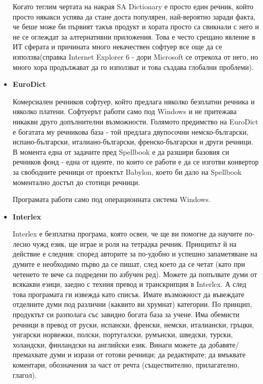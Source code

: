 \begin{itemize}
    Когато теглим чертата на накрая SA Dictionary е просто един
    речник, който просто някакси успява да стане доста популярен,
    най-вероятно заради факта, че беше може би първият такъв продукт и
    хората просто са свикнали с него и не се оглеждат за алтернативни
    приложения. Това е често срещано явление в ИТ сферата и причината
    много некачествен софтуер все още да се използва(справка Internet
    Explorer 6 - дори Microsoft се отрекоха от него, но много хора
    продължават да го използват и това създава глобални проблеми).

  \item \textbf{EuroDict}

    Комерсиален речников софтуер, който предлага няколко безплатни
    речника и няколко платени. Софтуерът работи само под Windows и не
    притежава никакви друго допълнителни възможности. Голямото
    предимство на EuroDict е богатата му речникова база - той предлага
    двупосочни немско-български, испано-български, италиано-български,
    френско-български и други речници. В момента една от задачите пред
    Spellbook е да разшири базовия си речников фонд - една от идеите,
    по които се работи е да се изготви конвертор за свободните речници
    от проектът Babylon, което би дало на Spellbook моментално достъп
    до стотици речници.

    Програмата работи само под операционната система Windows.

  \item \textbf{Interlex}

    Interlex е безплатна програма, която освен, че ще ви помогне да
    научите по-лесно чужд език, ще играе и роля на тетрадка
    речник. Принципът й на действие е следния: според авторите за
    по-удобно и успешно запаметяване на думите е необходимо първо да
    се пишат, след което да се четат (като при четенето те вече са
    подредени по азбучен ред). Можете да попълвате думи от всякакви
    езици, заедно с техния превод и транскрипция в Interlex. А след
    това програмата ги извежда като списък. Имате възможност да
    въвеждате отделните думи под различни (каквито ви хрумнат)
    категории. По принцип, продуктът си разполага със завидно богата
    база за учене. Има обемисти речници в превод от руски, испански,
    френски, немски, италиански, гръцки, унгарски норвежки, полски,
    португалски, румънски, шведски, турски, холандски, финландски на
    английски език. Винаги можете да добавяте/премахвате думи и изрази
    от готови речници; да редактирате; да вмъквате коментари,
    обозначения за част от речта (съществително, прилагателно,
    глагол).


\end{itemize}
